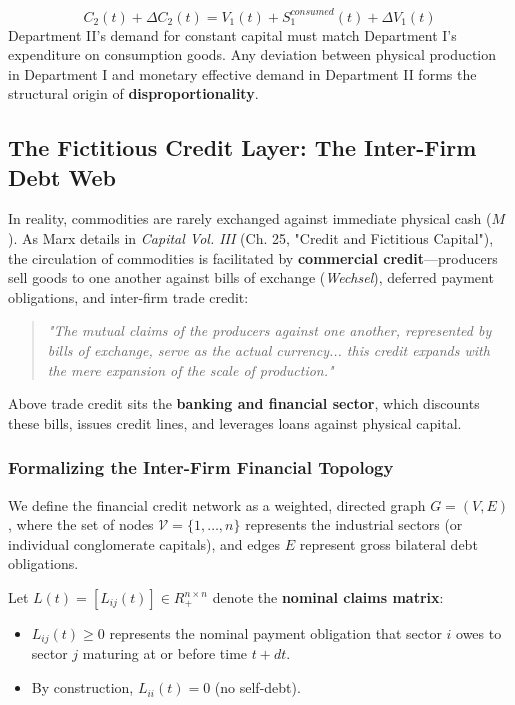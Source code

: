 \documentclass[11pt,letterpaper]{report}
\begin{document}
\[
{C}_{2}(t)+\Delta {C}_{2}(t)={V}_{1}(t)+{S}_{1}^{consumed}(t)+\Delta {V}_{1}(t)
\]
Department II's demand for constant capital must match Department I's expenditure on consumption goods. Any deviation between physical production in Department I and monetary effective demand in Department II forms the structural origin of \textbf{disproportionality}.

\subsection{The Fictitious Credit Layer: The Inter-Firm Debt Web}
In reality, commodities are rarely exchanged against immediate physical cash ($M$). As Marx details in \emph{Capital Vol. III} (Ch. 25, "Credit and Fictitious Capital"), the circulation of commodities is facilitated by \textbf{commercial credit}---producers sell goods to one another against bills of exchange (\emph{Wechsel}), deferred payment obligations, and inter-firm trade credit:

\begin{quote}
\emph{"The mutual claims of the producers against one another, represented by bills of exchange, serve as the actual currency... this credit expands with the mere expansion of the scale of production."}
\end{quote}

Above trade credit sits the \textbf{banking and financial sector}, which discounts these bills, issues credit lines, and leverages loans against physical capital.

\subsubsection{Formalizing the Inter-Firm Financial Topology}
We define the financial credit network as a weighted, directed graph $G=(V,E)$, where the set of nodes $\mathcal{V} = \{1, \dots, n\}$ represents the industrial sectors (or individual conglomerate capitals), and edges $E$ represent gross bilateral debt obligations.

Let $L(t)=[{L}_{ij}(t)]\in {R}_{+}^{n\times n}$ denote the \textbf{nominal claims matrix}:

\begin{itemize}
\item ${L}_{ij}(t)\geq 0$ represents the nominal payment obligation that sector $i$ owes to sector $j$ maturing at or before time $t+dt$.
\item By construction, ${L}_{ii}(t)=0$ (no self-debt).
\end{itemize}
\end{document}
